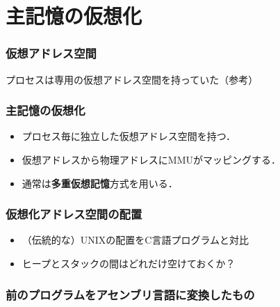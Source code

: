 \documentclass{beamer}                   %
\begin{document}
\section{主記憶の仮想化}
\begin{frame}
  \frametitle{仮想アドレス空間}
  プロセスは専用の仮想アドレス空間を持っていた（参考）
\end{frame}
\begin{frame}
  \frametitle{主記憶の仮想化}
  \begin{itemize}
    \item プロセス毎に独立した仮想アドレス空間を持つ．
    \item 仮想アドレスから物理アドレスにMMUがマッピングする．
    \item 通常は{\bf 多重仮想記憶}方式を用いる．
  \end{itemize}
\end{frame}

\begin{frame}
  \frametitle{仮想化アドレス空間の配置}
  \begin{itemize}
    \item （伝統的な）UNIXの配置をC言語プログラムと対比
    \item ヒープとスタックの間はどれだけ空けておくか？
  \end{itemize}
\end{frame}

\begin{frame}
  \frametitle{前のプログラムをアセンブリ言語に変換したもの}
\end{frame}
\end{document}
